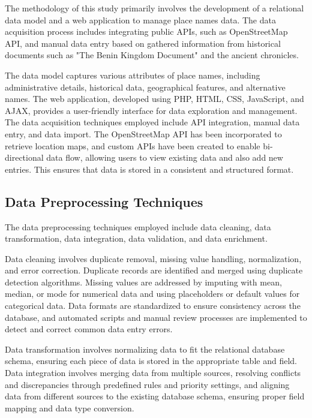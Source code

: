 The methodology of this study primarily involves the development of a relational data model and a web application to manage place names data. The data acquisition process includes integrating public APIs, such as OpenStreetMap API, and manual data entry based on gathered information from historical documents such as "The Benin Kingdom Document" and the ancient chronicles. 

The data model captures various attributes of place names, including administrative details, historical data, geographical features, and alternative names. The web application, developed using PHP, HTML, CSS, JavaScript, and AJAX, provides a user-friendly interface for data exploration and management. The data acquisition techniques employed include API integration, manual data entry, and data import. The OpenStreetMap API has been incorporated to retrieve location maps, and custom APIs have been created to enable bi-directional data flow, allowing users to view existing data and also add new entries. This ensures that data is stored in a consistent and structured format. 


\subsection{Data Preprocessing Techniques}

The data preprocessing techniques employed include data cleaning, data transformation, data integration, data validation, and data enrichment.

Data cleaning involves duplicate removal, missing value handling, normalization, and error correction. Duplicate records are identified and merged using duplicate detection algorithms. Missing values are addressed by imputing with mean, median, or mode for numerical data and using placeholders or default values for categorical data. Data formats are standardized to ensure consistency across the database, and automated scripts and manual review processes are implemented to detect and correct common data entry errors.

Data transformation involves normalizing data to fit the relational database schema, ensuring each piece of data is stored in the appropriate table and field.  Data integration involves merging data from multiple sources, resolving conflicts and discrepancies through predefined rules and priority settings, and aligning data from different sources to the existing database schema, ensuring proper field mapping and data type conversion.

